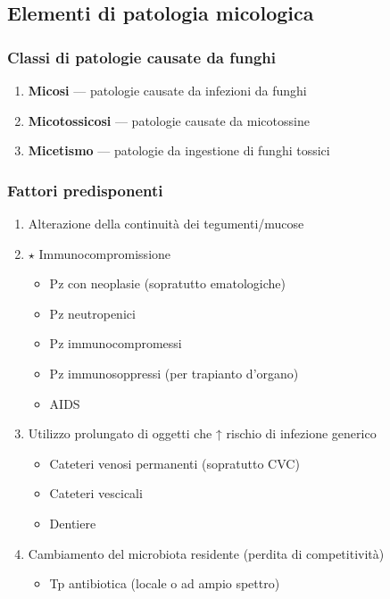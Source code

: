\documentclass[italian,]{article}
\providecommand{\tightlist}{%
  \setlength{\itemsep}{0pt}\setlength{\parskip}{0pt}}
\newcommand{\goldstandard}{\textcircled{$\star$} }                      %
\begin{document}
\hypertarget{elementi-di-patologia-micologica}{%
\subsection{Elementi di patologia
micologica}\label{elementi-di-patologia-micologica}}

\hypertarget{classi-di-patologie-causate-da-funghi}{%
\subsubsection{Classi di patologie causate da
funghi}\label{classi-di-patologie-causate-da-funghi}}

\begin{enumerate}
\def\labelenumi{\arabic{enumi}.}
\tightlist
\item
  \textbf{Micosi} --- patologie causate da infezioni da funghi
\item
  \textbf{Micotossicosi} --- patologie causate da micotossine
\item
  \textbf{Micetismo} --- patologie da ingestione di funghi tossici
\end{enumerate}

\hypertarget{fattori-predisponenti}{%
\subsubsection{Fattori predisponenti}\label{fattori-predisponenti}}

\begin{enumerate}
\def\labelenumi{\arabic{enumi}.}
\tightlist
\item
  Alterazione della continuità dei tegumenti/mucose
\item
  \goldstandard Immunocompromissione

  \begin{itemize}
  \tightlist
  \item
    Pz con neoplasie (sopratutto ematologiche)
  \item
    Pz neutropenici
  \item
    Pz immunocompromessi
  \item
    Pz immunosoppressi (per trapianto d'organo)
  \item
    AIDS
  \end{itemize}
\item
  Utilizzo prolungato di oggetti che ↑ rischio di infezione generico

  \begin{itemize}
  \tightlist
  \item
    Cateteri venosi permanenti (sopratutto CVC)
  \item
    Cateteri vescicali
  \item
    Dentiere
  \end{itemize}
\item
  Cambiamento del microbiota residente (perdita di competitività)

  \begin{itemize}
  \tightlist
  \item
    Tp antibiotica (locale o ad ampio spettro)
  \end{itemize}
\end{enumerate}
\end{document}
